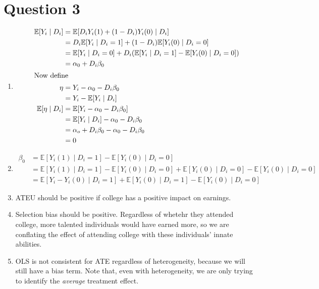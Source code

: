 \documentclass[11pt]{article}
\newcommand{\E}{\mathbb{E}}
\begin{document}
\section{Question 3}
\label{sec:orge198958}
  \begin{enumerate}[label=\alph*)]
\item 
\begin{align*}
\E[Y_i \mid D_i] &= \E[D_i Y_i(1) + (1 - D_i)Y_i(0) \mid D_i]\\
&= D_i \E [Y_i \mid D_i = 1] + (1 - D_i) \E [Y_i(0) \mid D_i = 0]\\
&= \E[Y_i \mid D_i = 0] + D_i (\E [Y_i \mid D_i = 1] - \E[Y_i (0) \mid D_i = 0])\\
&= \alpha_0 + D_i \beta_0     \\
\intertext{Now define}
\eta &= Y_i - \alpha_0 - D_i \beta_0 \\
&= Y_i - \E[Y_i \mid D_i]\\
\E[\eta \mid D_i] &= \E[Y_i - \alpha_0 - D_i \beta_0]\\
&= \E [Y_i \mid D_i] - \alpha_0 - D_i \beta_0\\
&= \alpha_o + D_i \beta_0 - \alpha_0 - D_i \beta_0\\
&= 0
\end{align*}
\item
\begin{align*}
\beta_0 &= \E [Y_i(1) \mid D_i = 1] - \E [Y_i(0) \mid D_i = 0]\\
&= \E[Y_i(1) \mid D_i = 1] - \E[Y_i(0) \mid D_i = 0] + \E[Y_i(0)\mid D_i = 0] - \E[Y_i(0)\mid D_i = 0]\\
&= \E[Y_i - Y_i(0) \mid D_i = 1] + \E[Y_i(0) \mid D_i = 1] - \E[Y_i (0) \mid D_i = 0]
\end{align*}
\item ATEU should be positive if college has a positive impact on earnings.

\item Selection bias should be positive. Regardless of whetehr they attended college, more talented individuals would have earned more, so we are conflating the effect of attending college with these individuals' innate abilities.

\item OLS is not consistent for ATE regardless of heterogeneity, because we will still have a bias term. Note that, even with heterogeneity, we are only trying to identify the \emph{average} treatment effect.
  \end{enumerate}
\end{document}
